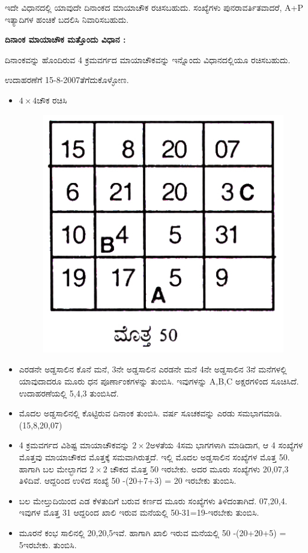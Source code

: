 ಇದೇ ವಿಧಾನದಲ್ಲಿ ಯಾವುದೇ ದಿನಾಂಕದ ಮಾಯಾಚೌಕ ರಚಿಸಬಹುದು. ಸಂಖ್ಯೆಗಳು ಪುನರಾವರ್ತಿತವಾದರೆ, A+P ಇತ್ಯಾದಿಗಳ ಹಂಚಿಕೆ ಬದಲಿಸಿ ನಿವಾರಿಸಬಹುದು.

\textbf{ದಿನಾಂಕ ಮಾಯಾಚೌಕ ಮತ್ತೊಂದು ವಿಧಾನ :}

ದಿನಾಂಕವನ್ನು ಹೊಂದಿರುವ 4 ಕ್ರಮವರ್ಗದ ಮಾಯಾಚೌಕವನ್ನು ಇನ್ನೊಂದು ವಿಧಾನದಲ್ಲಿಯೂ ರಚಿಸಬಹುದು.

ಉದಾಹರಣೆಗೆ 15-8-2007ತೆಗೆದುಕೊಳ್ಳೋಣ.
\begin{itemize}
	\item $4 \times 4$ಚೌಕ ರಚಿಸಿ
	\begin{figure}[h]
	\includegraphics{src/figures/chap3/fig3.46.jpg}
	\end{figure}
	\item ಎರಡನೇ ಅಡ್ಡಸಾಲಿನ ಕೊನೆ ಮನೆ, 3ನೇ ಅಡ್ಡಸಾಲಿನ ಎರಡನೇ ಮನೆ 4ನೇ ಅಡ್ಡಸಾಲಿನ 3ನೆ ಮನೆಗಳಲ್ಲಿ ಯಾವುದಾದರೂ ಮೂರು ಧನ ಪೂರ್ಣಾಂಕಗಳನ್ನು ತುಂಬಿಸಿ. ಇವುಗಳನ್ನು A,B,C ಅಕ್ಷರಗಳಿಂದ ಸೂಚಿಸಿದೆ. ಉದಾಹರಣೆಯಲ್ಲಿ 5,4,3 ತುಂಬಿಸಿದೆ.
	\item ಮೊದಲ ಅಡ್ಡಸಾಲಿನಲ್ಲಿ ಕೊಟ್ಟಿರುವ ದಿನಾಂಕ ತುಂಬಿಸಿ. ವರ್ಷ ಸೂಚಕವನ್ನು ಎರಡು ಸಮಭಾಗಮಾಡಿ. (15,8,20,07)
	\item 4 ಕ್ರಮವರ್ಗದ ವಿಶಿಷ್ಟ ಮಾಯಾಚೌಕವನ್ನು $2 \times 2$ಅಳತೆಯ 4ಸಮ ಭಾಗಗಳಾಗಿ ಮಾಡಿದಾಗ, ಆ 4 ಸಂಖ್ಯೆಗಳ ಮೊತ್ತವು ಮಾಯಾಚೌಕದ ಮೊತ್ತಕ್ಕೆ ಸಮವಾಗಿರುತ್ತದೆ. ಇಲ್ಲಿ ಮೊದಲ ಅಡ್ಡಸಾಲಿನ ಸಂಖ್ಯೆಗಳ ಮೊತ್ತ 50. ಹಾಗಾಗಿ ಬಲ ಮೇಲ್ಭಾಗದ $2 \times 2$ ಚೌಕದ ಮೊತ್ತ 50 ಇರಬೇಕು. ಅದರ ಮೂರು ಸಂಖ್ಯೆಗಳು 20,07,3 ತಿಳಿದಿವೆ. ಆದ್ದರಿಂದ ಉಳಿದ ಸಂಖ್ಯೆ 50 -(20+7+3) = 20 ಇರಬೇಕು ತುಂಬಿಸಿ.
	\item ಬಲ ಮೇಲ್ತುದಿಯಿಂದ ಎಡ ಕೆಳತುದಿಗೆ ಬರುವ ಕರ್ಣದ ಮೂರು ಸಂಖ್ಯೆಗಳು ತಿಳಿದಂತಾಗಿದೆ. 07,20,4. ಇವುಗಳ ಮೊತ್ತ 31 ಆದ್ದರಿಂದ ಖಾಲಿ ಇರುವ ಮನೆಯಲ್ಲಿ 50-31=19-ಇರಬೇಕು ತುಂಬಿಸಿ.
	\item ಮೂರನೆ ಕಂಭ ಸಾಲಿನಲ್ಲಿ 20,20,5ಇವೆ. ಹಾಗಾಗಿ ಖಾಲಿ ಇರುವ ಮನೆಯಲ್ಲಿ 50 -(20+20+5) = 5ಇರಬೇಕು. ತುಂಬಿಸಿ.

\end{itemize}
